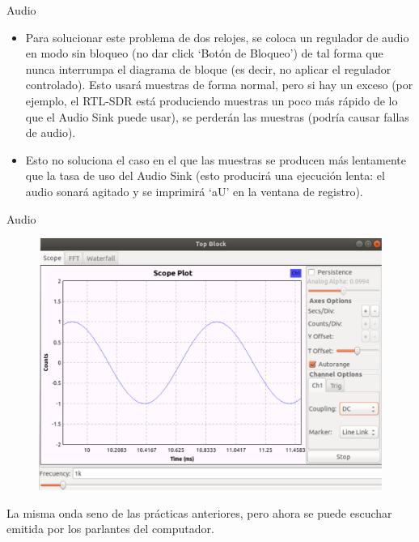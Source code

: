 \begin{frame}{Audio}
\begin{itemize}
    \item 
    {Para solucionar este problema de dos relojes, se coloca un regulador de audio en modo sin bloqueo (no dar click ‘Botón de Bloqueo’) de tal forma que nunca interrumpa el diagrama de bloque (es decir, no aplicar el regulador controlado). Esto usará muestras de forma normal, pero si hay un exceso (por ejemplo, el RTL-SDR está produciendo muestras un poco más rápido de lo que el Audio Sink puede usar), se perderán las muestras (podría causar fallas de audio).}
    \item 
    {Esto no soluciona el caso en el que las muestras se producen más lentamente que la tasa de uso del Audio Sink (esto producirá una ejecución lenta: el audio sonará agitado y se imprimirá ‘aU’ en la ventana de registro).}
\end{itemize}



\end{frame}

\begin{frame}{Audio}

\begin{figure}

\begin{center}
\vspace{-7mm}
\includegraphics[width=\textwidth, height=0.6\paperheight]{parte1/lab4/pdf/lab4_5.pdf}
\end{center}
\end{figure}
\vspace{-4mm}
La misma onda seno de las prácticas anteriores, pero ahora se puede escuchar emitida por los parlantes del computador.
\end{frame}

